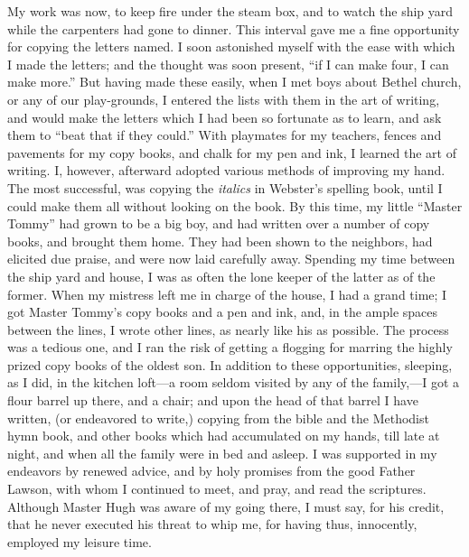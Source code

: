 My work was now, to keep fire under the steam box, and to watch the ship
yard while the carpenters had gone to dinner. This interval gave me a
fine opportunity for copying the letters named. I soon astonished myself
with the ease with which I made the letters; and the thought was soon
present, ``if I can make four, I can make more.'' But having made these
easily, when I met boys about Bethel church, or any of our play-grounds,
I entered the lists with them in the art of writing, and would make the
letters which I had been so fortunate as to learn, and ask them to
``beat that if they could.'' With playmates for my teachers, fences and
pavements for my copy books, and chalk for my pen and ink, I learned the
art of writing. I, however, afterward adopted various methods of
improving my hand. The most successful, was copying the \emph{italics}
in Webster's spelling book, until I could make them all without looking
on the book. By this time, my little ``Master Tommy'' had grown to be a
big boy, and had written over a number of copy books, and brought them
{}home. They had been shown to the neighbors, had elicited due praise,
and were now laid carefully away. Spending my time between the ship yard
and house, I was as often the lone keeper of the latter as of the
former. When my mistress left me in charge of the house, I had a grand
time; I got Master Tommy's copy books and a pen and ink, and, in the
ample spaces between the lines, I wrote other lines, as nearly like his
as possible. The process was a tedious one, and I ran the risk of
getting a flogging for marring the highly prized copy books of the
oldest son. In addition to these opportunities, sleeping, as I did, in
the kitchen loft---a room seldom visited by any of the family,---I got a
flour barrel up there, and a chair; and upon the head of that barrel I
have written, (or endeavored to write,) copying from the bible and the
Methodist hymn book, and other books which had accumulated on my hands,
till late at night, and when all the family were in bed and asleep. I
was supported in my endeavors by renewed advice, and by holy promises
from the good Father Lawson, with whom I continued to meet, and pray,
and read the scriptures. Although Master Hugh was aware of my going
there, I must say, for his credit, that he never executed his threat to
whip me, for having thus, innocently, employed my leisure time.
